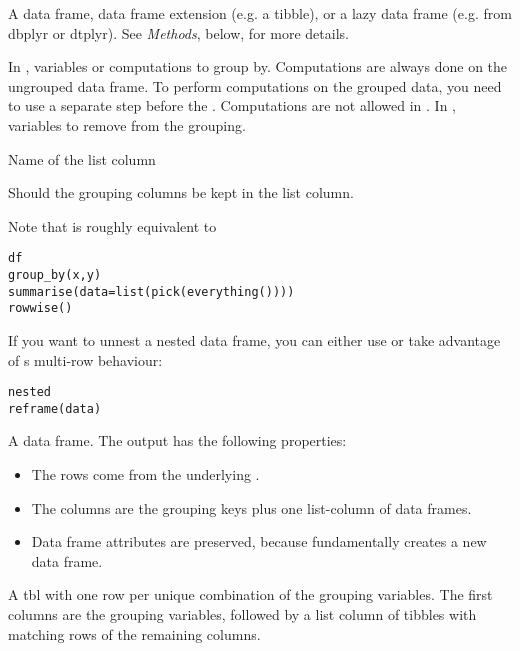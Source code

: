 \documentclass[a4paper]{book}
\begin{document}
\begin{Arguments}
\begin{ldescription}
\item[\code{.data}] A data frame, data frame extension (e.g. a tibble), or a
lazy data frame (e.g. from dbplyr or dtplyr). See \emph{Methods}, below, for
more details.

\item[\code{...}] In , variables or computations to group by.
Computations are always done on the ungrouped data frame.
To perform computations on the grouped data, you need to use
a separate  step before the .
Computations are not allowed in .
In , variables to remove from the grouping.

\item[\code{.key}] Name of the list column

\item[\code{.keep}] Should the grouping columns be kept in the list column.
\end{ldescription}
\end{Arguments}
%
\begin{Details}
Note that  is roughly equivalent to

\begin{alltt}df %>%
  group_by(x, y) %>%
  summarise(data = list(pick(everything()))) %>%
  rowwise()
\end{alltt}


If you want to unnest a nested data frame, you can either use
 or take advantage of s multi-row behaviour:

\begin{alltt}nested %>%
  reframe(data)
\end{alltt}

\end{Details}
%
\begin{Value}
A  data frame. The output has the following properties:
\begin{itemize}

\item{} The rows come from the underlying .
\item{} The columns are the grouping keys plus one list-column of data frames.
\item{} Data frame attributes are  preserved, because 
fundamentally creates a new data frame.

\end{itemize}


A tbl with one row per unique combination of the grouping variables.
The first columns are the grouping variables, followed by a list column of tibbles
with matching rows of the remaining columns.
\end{Value}
\end{document}
